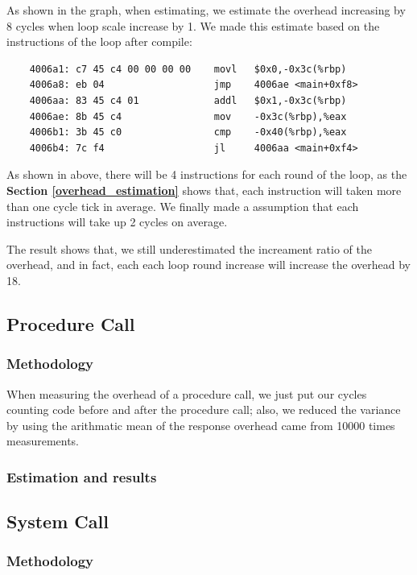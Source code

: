 As shown in the graph, when estimating, we estimate the overhead increasing by 8 cycles when loop scale increase by 1. We made this estimate based on the instructions of the loop after compile:

\begin{lstlisting}
    4006a1:	c7 45 c4 00 00 00 00 	movl   $0x0,-0x3c(%rbp)
    4006a8:	eb 04                	jmp    4006ae <main+0xf8>
    4006aa:	83 45 c4 01          	addl   $0x1,-0x3c(%rbp)
    4006ae:	8b 45 c4             	mov    -0x3c(%rbp),%eax
    4006b1:	3b 45 c0             	cmp    -0x40(%rbp),%eax
    4006b4:	7c f4                	jl     4006aa <main+0xf4>
\end{lstlisting}

As shown in above, there will be 4 instructions for each round of the loop, as the \textbf{Section \ref{overhead_estimation}} shows that, each instruction will taken more than one cycle tick in average.
We finally made a assumption that each instructions will take up 2 cycles on average.

The result shows that, we still underestimated the increament ratio of the overhead, and in fact, each each loop round increase will increase the overhead by 18.

\subsection{Procedure Call}

\subsubsection{Methodology}

When measuring the overhead of a procedure call, we just put our cycles counting code before and after the procedure call; also, we reduced the variance by using the arithmatic mean of the response overhead
came from 10000 times measurements.

\subsubsection{Estimation and results}



\subsection{System Call}

\subsubsection{Methodology}

